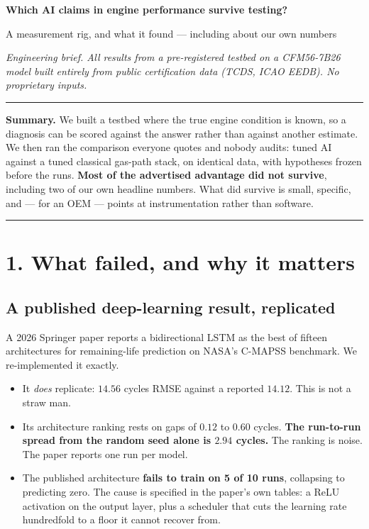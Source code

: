 \documentclass[11pt]{article}
\begin{document}
\begin{center}
{\LARGE\bfseries Which AI claims in engine performance survive testing?\par}
\vspace{1mm}
{\large A measurement rig, and what it found --- including about our own numbers\par}
\vspace{2mm}
{\small\itshape Engineering brief. All results from a pre-registered testbed on a
CFM56-7B26 model built entirely from public certification data (TCDS, ICAO EEDB).
No proprietary inputs.\par}
\end{center}
\vspace{1mm}

\hrule
\vspace{2mm}
\textbf{Summary.} We built a testbed where the true engine condition is known, so
a diagnosis can be scored against the answer rather than against another
estimate. We then ran the comparison everyone quotes and nobody audits: tuned AI
against a tuned classical gas-path stack, on identical data, with hypotheses
frozen before the runs. \textbf{Most of the advertised advantage did not
survive}, including two of our own headline numbers. What did survive is small,
specific, and --- for an OEM --- points at instrumentation rather than software.
\vspace{2mm}
\hrule

\section{1. What failed, and why it matters}

\subsection{A published deep-learning result, replicated}
A 2026 Springer paper reports a bidirectional LSTM as the best of fifteen
architectures for remaining-life prediction on NASA's C-MAPSS benchmark. We
re-implemented it exactly.

\begin{itemize}
  \item It \emph{does} replicate: $14.56$ cycles RMSE against a reported
        $14.12$. This is not a straw man.
  \item Its architecture ranking rests on gaps of $0.12$ to $0.60$ cycles.
        \textbf{The run-to-run spread from the random seed alone is $2.94$
        cycles.} The ranking is noise. The paper reports one run per model.
  \item The published architecture \textbf{fails to train on 5 of 10 runs},
        collapsing to predicting zero. The cause is specified in the paper's own
        tables: a ReLU activation on the output layer, plus a scheduler that cuts
        the learning rate hundredfold to a floor it cannot recover from.
\end{itemize}
\end{document}
